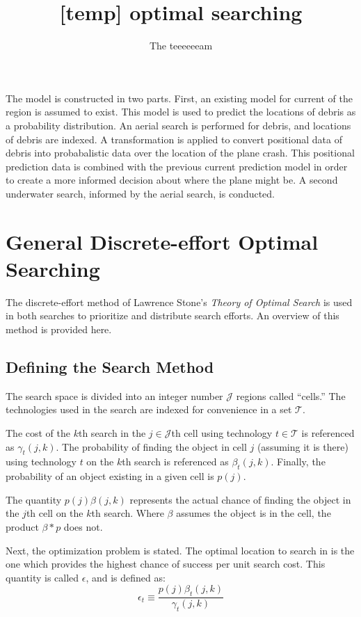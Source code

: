 \documentclass[a4paper,twocolumns]{article}
\title{[temp] optimal searching}
\author{The teeeeeeam}
\begin{document}
\maketitle\tableofcontents\pagebreak
\begin{multicols}{2}

The model is constructed in two parts. First, an existing model for current of the region is assumed to exist. This model is used to predict the locations of debris as a probability distribution. An aerial search is performed for debris, and locations of debris are indexed. A transformation is applied to convert positional data of debris into probabalistic data over the location of the plane crash. This positional prediction data is combined with the previous current prediction model in order to create a more informed decision about where the plane might be. A second underwater search, informed by the aerial search, is conducted.

\section{General Discrete-effort Optimal Searching}

The discrete-effort method of Lawrence Stone's \textit{Theory of Optimal Search} is used in both searches to prioritize and distribute search efforts. An overview of this method is provided here. 

\subsection{Defining the Search Method}

The search space is divided into an integer number $\mathcal{J}$ regions called ``cells.'' The technologies used in the search are indexed for convenience in a set $\mathcal{T}$. 


The cost of the $k$th search in the $j\in\mathcal{J}$th cell using technology $t\in\mathcal{T}$ is referenced as $\gamma_t(j,k)$. The probability of finding the object in cell $j$ (assuming it is there) using technology $t$ on the $k$th search is referenced as $\beta_t(j,k)$. Finally, the probability of an object existing in a given cell is $p(j)$. 

The quantity $p(j)\beta(j,k)$ represents the actual chance of finding the object in the $j$th cell on the $k$th search. Where $\beta$ assumes the object is in the cell, the product $\beta * p$ does not.

Next, the optimization problem is stated. The optimal location to search in is the one which provides the highest chance of success per unit search cost. This quantity is called $\epsilon$, and is defined as: $$\epsilon_t\equiv\frac{p(j)\beta_t(j,k)}{\gamma_t(j,k)}$$


\end{multicols}
\end{document}
